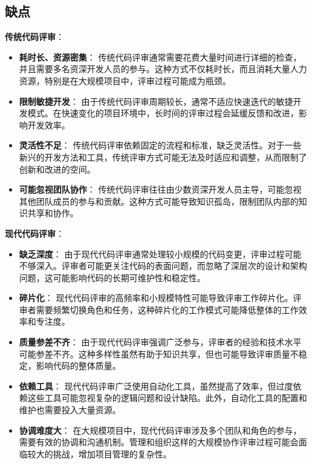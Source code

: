 \documentclass{article}
\begin{document}
\subsection{缺点}

\textbf{传统代码评审}：

\begin{itemize}
    \item \textbf{耗时长、资源密集}：
    传统代码评审通常需要花费大量时间进行详细的检查，并且需要多名资深开发人员的参与。这种方式不仅耗时长，而且消耗大量人力资源，特别是在大规模项目中，评审过程可能成为瓶颈。

    \item \textbf{限制敏捷开发}：
    由于传统代码评审周期较长，通常不适应快速迭代的敏捷开发模式。在快速变化的项目环境中，长时间的评审过程会延缓反馈和改进，影响开发效率。

    \item \textbf{灵活性不足}：
    传统代码评审依赖固定的流程和标准，缺乏灵活性。对于一些新兴的开发方法和工具，传统评审方式可能无法及时适应和调整，从而限制了创新和改进的空间。

    \item \textbf{可能忽视团队协作}：
    传统代码评审往往由少数资深开发人员主导，可能忽视其他团队成员的参与和贡献。这种方式可能导致知识孤岛，限制团队内部的知识共享和协作。
\end{itemize}

\textbf{现代代码评审}：

\begin{itemize}
    \item \textbf{缺乏深度}：
    由于现代代码评审通常处理较小规模的代码变更，评审过程可能不够深入。评审者可能更关注代码的表面问题，而忽略了深层次的设计和架构问题，这可能影响代码的长期可维护性和稳定性。

    \item \textbf{碎片化}：
    现代代码评审的高频率和小规模特性可能导致评审工作碎片化。评审者需要频繁切换角色和任务，这种碎片化的工作模式可能降低整体的工作效率和专注度。

    \item \textbf{质量参差不齐}：
    由于现代代码评审强调广泛参与，评审者的经验和技术水平可能参差不齐。这种多样性虽然有助于知识共享，但也可能导致评审质量不稳定，影响代码的整体质量。

    \item \textbf{依赖工具}：
    现代代码评审广泛使用自动化工具，虽然提高了效率，但过度依赖这些工具可能忽视复杂的逻辑问题和设计缺陷。此外，自动化工具的配置和维护也需要投入大量资源。

    \item \textbf{协调难度大}：
    在大规模项目中，现代代码评审涉及多个团队和角色的参与，需要有效的协调和沟通机制。管理和组织这样的大规模协作评审过程可能会面临较大的挑战，增加项目管理的复杂性。
\end{itemize}
\end{document}
